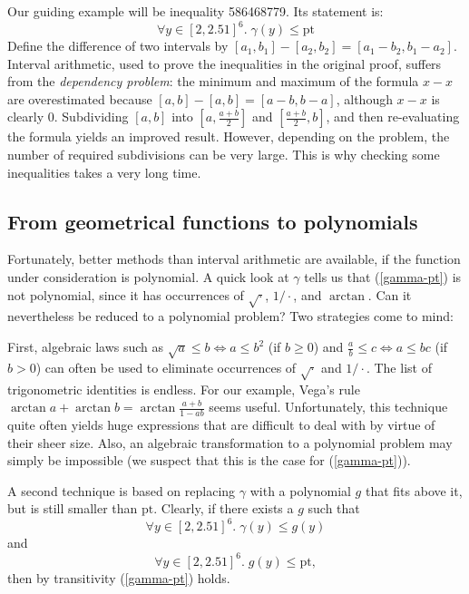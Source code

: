 \documentclass[11pt]{amsart}
\def\sfrac#1#2{{\textstyle \frac {#1} {#2}}}
\def\eqref#1{(\ref{#1})}
\def\pt{\mathrm{pt}}
\begin{document}
Our guiding example will be inequality 586468779. Its statement is:
\begin{equation}
\forall y \in [2,2.51]^6.\; \gamma(y) \le \pt \label{gamma-pt}
\end{equation}
Define the difference of two intervals by $[a_1,b_1]-[a_2,b_2] = [a_1-b_2,b_1-a_2]$.
Interval arithmetic, used to prove the inequalities in the original proof,
suffers from the \emph{dependency problem}: the minimum and maximum of the
formula $x-x$ are overestimated because $[a,b] - [a,b] = [a-b,b-a]$, although
$x-x$ is clearly $0$. Subdividing $[a,b]$ into $[a,\sfrac{a+b}2]$ and
$[\sfrac{a+b}2,b]$, and then re-evaluating the formula yields an improved
result. However, depending on the problem, the number of required subdivisions
can be very large. This is why checking some inequalities takes a very long
time.

\subsection*{From geometrical functions to polynomials}
Fortunately, better methods than interval arithmetic are available, if the
function under consideration is polynomial. A quick look at $\gamma$ tells us
that \eqref{gamma-pt} is not polynomial, since it has occurrences of
$\sqrt\cdot$, $1/\cdot$, and $\arctan$. Can it nevertheless be reduced
to a polynomial problem? Two strategies come to mind:

First, algebraic laws such as $\sqrt a \le b \Leftrightarrow a \le b^2$ (if $b
\ge 0$) and $\frac a b \le c \Leftrightarrow a \le bc$ (if $b>0$) can often be
used to eliminate occurrences of $\sqrt\cdot$ and $1/\cdot$. The list of
trigonometric identities is endless. For our example, Vega's rule $\arctan a +
\arctan b = \arctan \frac {a + b} {1 - ab}$ seems useful. Unfortunately, this
technique quite often yields huge expressions that are difficult to deal with by
virtue of their sheer size. Also, an algebraic transformation to a polynomial problem may
simply be impossible (we suspect that this is the case for \eqref{gamma-pt}).

A second technique is based on replacing $\gamma$ with a polynomial $g$ that
fits above it, but is still smaller than $\pt$. Clearly, if there exists a $g$
such that
\begin{equation}
\forall y \in [2,2.51]^6.\; \gamma(y) \le g(y) \label{gamma-g}
\end{equation}
and
\begin{equation}
\forall y \in [2,2.51]^6.\; g(y) \le \pt, \label{g-pt}
\end{equation}
then by transitivity \eqref{gamma-pt} holds.
\end{document}
